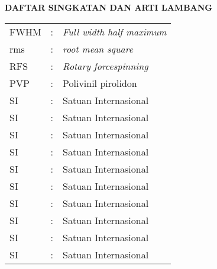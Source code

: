\clearpage
{}
{}

\begin{center}
    \large \textbf{DAFTAR SINGKATAN DAN ARTI LAMBANG}
\end{center}
\vspace{3em}

\begin{center}
    \begin{table}[htbp]
        \begin{tabular}{l l l}
            FWHM            &:& \textit{Full width half maximum} \\ %
            rms             &:& \textit{root mean square}        \\ %
            RFS             &:& \textit{Rotary forcespinning}    \\ %
            PVP             &:& Polivinil pirolidon              \\ %
            SI              &:& Satuan Internasional             \\ %
            SI              &:& Satuan Internasional             \\ %
            SI              &:& Satuan Internasional             \\ %
            SI              &:& Satuan Internasional             \\ %
            SI              &:& Satuan Internasional             \\ %
            SI              &:& Satuan Internasional             \\ %
            SI              &:& Satuan Internasional             \\ %
            SI              &:& Satuan Internasional             \\ %
            SI              &:& Satuan Internasional             \\ %
            SI              &:& Satuan Internasional             \\
        \end{tabular}
    \end{table}
\end{center}



